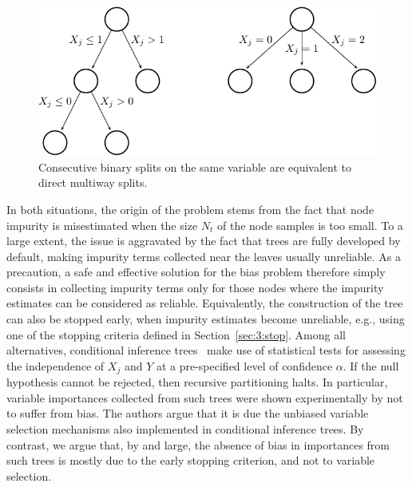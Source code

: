 \begin{figure}
    \centering
    \includegraphics[scale=1.0]{figures/ch7_splits.pdf}
    \caption{Consecutive binary splits on the same variable are equivalent to direct multiway splits.}
    \label{fig:7:splits}
\end{figure}

In both situations, the origin of the problem stems from the fact that node
impurity is misestimated when the size $N_t$ of the node samples is too small.
To a large extent, the issue is aggravated by the fact that trees are fully
developed by default, making impurity terms collected near the leaves usually
unreliable. As a precaution, a safe and effective solution for the bias problem
therefore simply consists in collecting impurity terms only for those nodes
where the impurity estimates can be considered as reliable. Equivalently, the
construction of the tree can also be stopped early, when impurity estimates
become unreliable, e.g., using one of the stopping criteria defined in
Section~\ref{sec:3:stop}. Among all alternatives, conditional inference
trees~\citep{hothorn:2006} make use of statistical tests for assessing the
independence of $X_j$ and $Y$ at a pre-specified level of confidence $\alpha$.
If the null hypothesis cannot be rejected, then recursive partitioning halts.
In particular, variable importances collected from such trees were shown
experimentally by \citet{strobl:2007b} not to suffer from bias. The authors
argue that it is due the unbiased variable selection mechanisms also
implemented in conditional inference trees. By contrast, we argue that, by and
large, the absence of bias in importances from such trees is mostly due to the
early stopping criterion, and not to variable selection.

